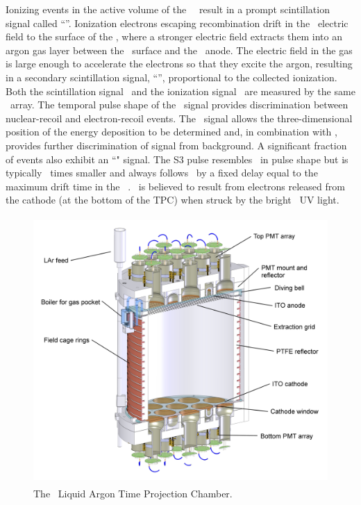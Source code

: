 Ionizing events in the active volume of the \lar\ \tpc\ result in a prompt scintillation signal called ``\sone''.  Ionization electrons escaping recombination drift in the \tpc\ electric field to the surface of the \lar, where a stronger electric field extracts them into an argon gas layer between the \lar\ surface and the \tpc\ anode.  The electric field in the gas is large enough to accelerate the electrons so that they excite the argon, resulting in a secondary scintillation signal, ``\stwo'', proportional to the collected ionization.  Both the scintillation signal \sone\ and the ionization signal \stwo\ are measured by the same \pmt\ array.  The temporal pulse shape of the \sone\ signal provides discrimination between nuclear-recoil and electron-recoil events.  The \stwo\ signal allows the three-dimensional position of the energy deposition to be determined and, in combination with \sone, provides further discrimination of signal from background.   A significant fraction of events also exhibit an ``\sthree" signal.  The S3 pulse resembles \stwo\ in pulse shape but is typically \dsfstwooversthree\ times smaller and always follows \stwo\ by a fixed delay equal to the maximum drift time in the \lar\ \tpc.  \sthree\ is believed to result from electrons released from the cathode (at the bottom of the TPC) when struck by the bright \stwo\ UV light.

\begin{figure}[t!]
\begin{center}
\includegraphics[height=4.0in]{Figures/50kg_Assembly_4-1-13_section_annotated_2.JPG}
\caption{The \dsf\ Liquid Argon Time Projection Chamber.}
\label{fig:ds-50-tpc}
\end{center}
\end{figure}

